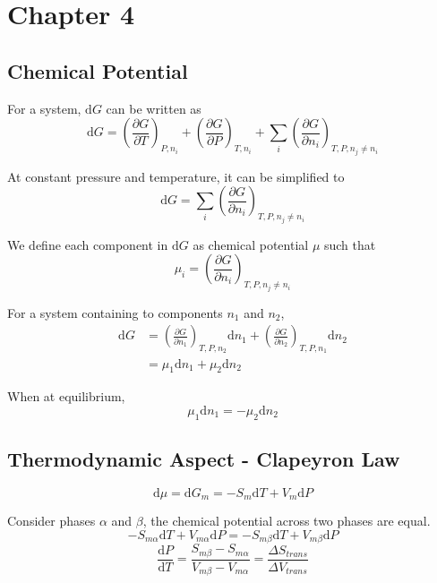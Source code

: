 \documentclass[letterpaper]{article}
\newcommand{\diff}{\mathrm{d}}
\begin{document}
\newpage
\section*{Chapter 4}
\subsection*{Chemical Potential}
For a system, $\diff G$ can be written as
\begin{equation*}
    \diff G=(\frac{\partial G}{\partial T})_{P,n_i}+(\frac{\partial G}{\partial P})_{T,n_i}
    +\sum_i(\frac{\partial G}{\partial n_i})_{T,P,n_j\neq n_i}
\end{equation*}

At constant pressure and temperature, it can be simplified to
\begin{equation*}
    \diff G=\sum_i(\frac{\partial G}{\partial n_i})_{T,P,n_j\neq n_i}
\end{equation*}

We define each component in $\diff G$ as chemical potential $\mu$ such that
\begin{equation*}
    \mu_i=(\frac{\partial G}{\partial n_i})_{T,P,n_j\neq n_i}
\end{equation*}

For a system containing to components $n_1$ and $n_2$,
\begin{equation*}
    \begin{aligned}
        \diff G&=(\frac{\partial G}{\partial n_1})_{T,P,n_2}\diff n_1+(\frac{\partial G}{\partial n_2})
        _{T,P,n_1}\diff n_2\\
        &=\mu_1\diff n_1+\mu_2\diff n_2
    \end{aligned}
\end{equation*}

When at equilibrium,
\begin{equation*}
    \mu_1\diff n_1=-\mu_2\diff n_2
\end{equation*}
\subsection*{Thermodynamic Aspect - Clapeyron Law}
\begin{equation*}
    \diff\mu=\diff G_m=-S_m\diff T+V_m\diff P
\end{equation*}

Consider phases $\alpha$ and $\beta$, the chemical potential across two phases are equal.
\begin{equation*}
    -S_{m\alpha}\diff T+V_{m\alpha}\diff P=-S_{m\beta}\diff T+V_{m\beta}\diff P
\end{equation*}
\begin{equation*}
    \boxed{\frac{\diff P}{\diff T}=\frac{S_{m\beta}-S_{m\alpha}}{V_{m\beta}-V_{m\alpha}}
    =\frac{\Delta S_{trans}}{\Delta V_{trans}}}
\end{equation*}
\end{document}
